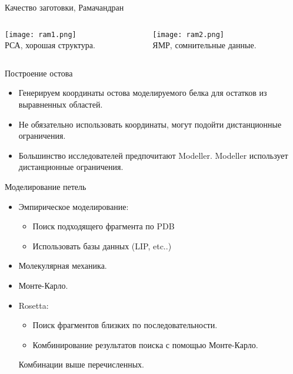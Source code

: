 \begin{frame}
{Качество заготовки, Рамачандран}
		 \begin{columns}
		\begin{column}{0.5\textwidth}
			\begin{center}
			\texttt{[image: ram1.png]}\\
			РСА, хорошая структура.
			\end{center}
		\end{column}
		\begin{column}{0.5\textwidth}
			\begin{center}
			\texttt{[image: ram2.png]}\\
           ЯМР, сомнительные данные.
			\end{center}
		  \end{column}
		 \end{columns}
\end{frame}
\begin{frame}
{Построение остова}
\begin{itemize}
	\item
Генерируем координаты остова моделируемого белка для остатков из выравненных областей.
\item
Не обязательно использовать координаты, могут подойти дистанционные ограничения.
\item
Большинство исследователей предпочитают Modeller. Modeller использует дистанционные ограничения. 	   
\end{itemize}
\end{frame}
\begin{frame}
{Моделирование петель}
	\begin{itemize}
		\item
			Эмпирическое моделирование:
			\begin{itemize}
				\item
					Поиск подходящего фрагмента по PDB 
				\item
					Использовать базы данных (LIP, etc..)
			\end{itemize}
 		         \item
					 Молекулярная механика.
				 \item
					 Монте-Карло.
				 \item
					 Rosetta:
					 \begin{itemize}
						 \item
			 Поиск фрагментов близких по последовательности.
						 \item
			 Комбинирование результатов поиска с помощью Монте-Карло.
					 \end{itemize}
					 \vspace{1.0cm}
		  Комбинации выше перечисленных.
	\end{itemize}
\end{frame}
